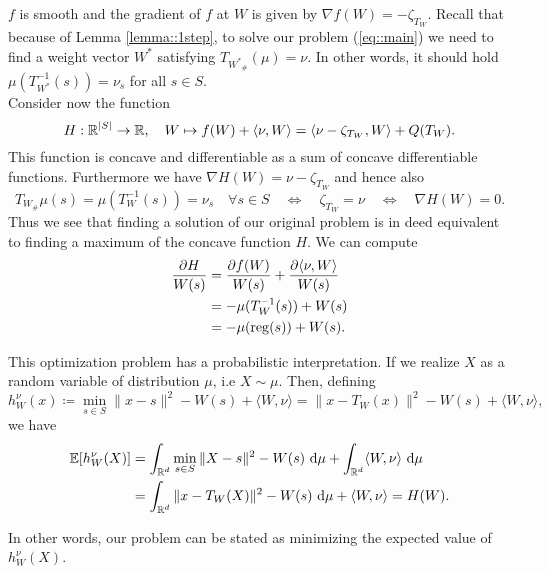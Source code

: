 \documentclass[
     12pt,         %
     a4paper,      %
     BCOR=10mm,     %
     DIV=14,        %
     ]{scrreprt}
\begin{document}

    $f$ is smooth and the gradient of $f$ at $W$ is given by $\nabla f(W) = - \zeta_{T_{W}}$.
    Recall that because of Lemma \ref{lemma::1step}, to solve our problem (\ref{eq::main}) we need to find a weight vector $W^*$ satisfying $T_{{W^*}_{\#}}(\mu) = \nu$. 
    In other words, it should hold $\mu(T_{W^*}^{-1} (s)) = \nu_s $ for all $s\in S$. \\
    Consider now the function
    \[H: \operatorname{\mathbb{R}}^{|S|} \to \operatorname{\mathbb{R}}, \quad W \mapsto f(W) + \langle \nu, W \rangle = \langle \nu - \zeta_{T_{W}}, W \rangle + Q(T_W). \]
    This function is concave and differentiable as a sum of concave differentiable functions. Furthermore we have $\nabla H(W) = \nu - \zeta_{T_{W}}$ and hence also
    \[ T_{W_{\#}}\mu(s) =\mu(T_W^{-1}(s)) = \nu_s \quad \forall s\in S \quad  \Leftrightarrow \quad  \zeta_{T_{W}} = \nu \quad  \Leftrightarrow \quad \nabla H(W) = 0. \]
    Thus we see that finding a solution of our original problem is in deed equivalent to finding a maximum of the concave function $H$. We can compute
    \begin{align*}
        \frac{\partial H}{W(s)}  &=  \frac{\partial f(W)}{W(s)}  + \frac{\partial \langle \nu, W \rangle}{W(s)} \\
                                &= -\mu(T_W^{-1}(s)) + W(s) \\
                                &= -\mu(\operatorname{reg}(s)) + W(s).
    \end{align*}
    
    This optimization problem has a probabilistic interpretation. If we realize $X$ as a random variable of distribution $\mu$, i.e $X \sim \mu$. Then, defining
    \[h_W^\nu(x) \coloneqq \min_{s\in S} \|x-s\|^2 - W(s) + \langle W, \nu  \rangle = \|x-T_W(x)\|^2 -W(s) + \langle W, \nu  \rangle, \]
    we have
    \begin{align*}
        \operatorname{\mathbb{E}}[h_W^\nu(X)] &= \int_{\operatorname{\mathbb{R}}^d} \min_{s\in S} \|X-s\|^2 - W(s) \ {\operatorname{{\mathrm{d}}}} \mu + \int_{\operatorname{\mathbb{R}}^d} \langle W, \nu  \rangle  \ {\operatorname{{\mathrm{d}}}} \mu \\
                    &= \int_{\operatorname{\mathbb{R}}^d} \|x-T_W(X)\|^2 -W(s) \ {\operatorname{{\mathrm{d}}}} \mu + \langle W, \nu  \rangle  = H(W).
    \end{align*}

    In other words, our problem can be stated as minimizing the expected value of $h_W^\nu(X)$.
     
    
\end{document}
